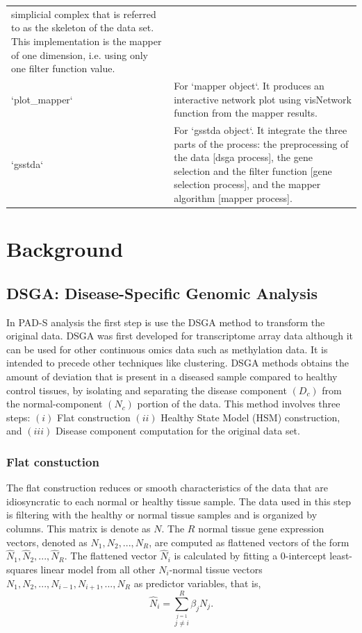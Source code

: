 \begin{table}
\begin{tabular}[t]{>{\raggedright\arraybackslash}p{1in}>{\raggedright\arraybackslash}p{4in}}
 simplicial complex that is referred to as the skeleton of the data set. This implementation is the mapper of 
 one dimension, i.e. using only one filter function value.\\
`plot\_mapper` & For `mapper object`. It produces an interactive network plot using visNetwork 
 function from the mapper results.\\
\addlinespace
`gsstda` & For `gsstda object`. It integrate the three parts of the process: the preprocessing of the data [dsga process], 
 the gene selection and the filter function [gene selection process], and the mapper algorithm [mapper process].\\
\bottomrule
\end{tabular}
\end{table}

\hypertarget{section2}{%
\section{Background}\label{section2}}

\hypertarget{section2.1}{%
\subsection{DSGA: Disease-Speciﬁc Genomic Analysis}\label{section2.1}}

In PAD-S analysis the first step is use the DSGA method to transform the original data.
DSGA was first developed for transcriptome array data although it can be used for other continuous omics data such as methylation data. It is intended to precede other techniques like clustering. DSGA methods obtains the amount of deviation that is present in a diseased sample compared to healthy control tissues, by isolating and separating the disease component \((D_{c})\) from the normal-component \((N_{c})\) portion of the data. This method involves three steps: \((i)\) Flat construction \((ii)\) Healthy State Model (HSM) construction, and \((iii)\) Disease component computation for the original data set.

\hypertarget{section2.1.1}{%
\subsubsection{Flat constuction}\label{section2.1.1}}

The flat construction reduces or smooth characteristics of the data that are idiosyncratic to each normal or healthy tissue sample. The data used in this step is filtering with the healthy or normal tissue samples and is organized by columns. This matrix is denote as \(N\). The \(R\) normal tissue gene expression vectors, denoted as \(N_{1},N_{2},...,N_{R}\), are computed as flattened vectors of the form \(\hat{N}_{1},\hat{N}_{2},...,\hat{N}_{R}\). The flattened vector \(\hat{N}_i\) is calculated by fitting a \(0\)-intercept least-squares linear model from all other \(N_i\)-normal tissue vectors \(N_{1},N_{2},...,N_{i-1},N_{i+1},...,N_{R}\) as predictor variables, that is,
\[\hat{N}_{i} = \sum_{\stackrel{j=1}{j\neq i}}^{R}\beta_{j}N_{j}.\]

